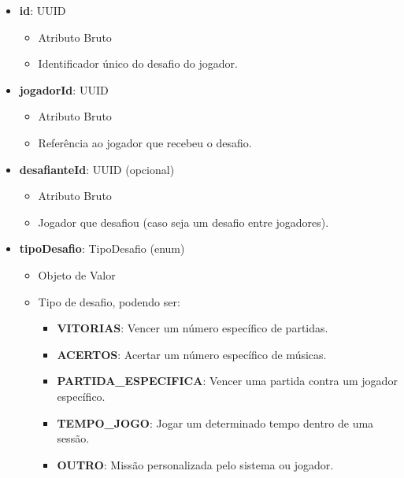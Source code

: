     \begin{itemize}
        \item \textbf{id}: UUID  
              \begin{itemize}
                  \item Atributo Bruto
                  \item Identificador único do desafio do jogador.
              \end{itemize}
    
        \item \textbf{jogadorId}: UUID  
              \begin{itemize}
                  \item Atributo Bruto
                  \item Referência ao jogador que recebeu o desafio.
              \end{itemize}
    
        \item \textbf{desafianteId}: UUID (opcional)  
              \begin{itemize}
                  \item Atributo Bruto
                  \item Jogador que desafiou (caso seja um desafio entre jogadores).
              \end{itemize}
    
        \item \textbf{tipoDesafio}: TipoDesafio (enum)  
              \begin{itemize}
                  \item Objeto de Valor
                  \item Tipo de desafio, podendo ser:
                  \begin{itemize}
                      \item \textbf{VITORIAS}: Vencer um número específico de partidas.
                      \item \textbf{ACERTOS}: Acertar um número específico de músicas.
                      \item \textbf{PARTIDA\_ESPECIFICA}: Vencer uma partida contra um jogador específico.
                      \item \textbf{TEMPO\_JOGO}: Jogar um determinado tempo dentro de uma sessão.
                      \item \textbf{OUTRO}: Missão personalizada pelo sistema ou jogador.
                  \end{itemize}
              \end{itemize}
    

\end{itemize}
